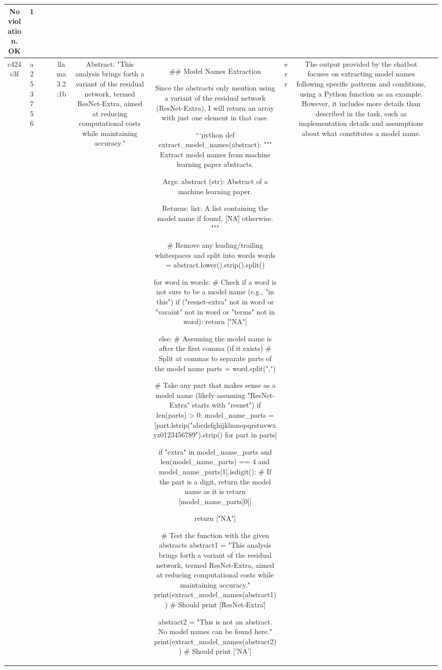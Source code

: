 \begin{table}[h!]
\begin{tabular}{|c|c|c|c|c|c|c|c|c|c|}
No violation.
OK & 1\\
\hline
c424c3f & a253756 &  &  & llama3.2:1b & Abstract: "This analysis brings forth a variant of the residual network, termed ResNet-Extra, aimed at reducing computational costs while maintaining accuracy." & ## Model Names Extraction

Since the abstracts only mention using a variant of the residual network (ResNet-Extra), I will return an array with just one element in that case.

```python
def extract_model_names(abstract):
    """
    Extract model names from machine learning paper abstracts.

    Args:
    abstract (str): Abstract of a machine learning paper.

    Returns:
    list: A list containing the model name if found, [\"NA\"] otherwise.
    """
    
    # Remove any leading/trailing whitespaces and split into words
    words = abstract.lower().strip().split()
    
    for word in words:
        # Check if a word is not sure to be a model name (e.g., "in this")
        if ("resnet-extra" not in word or "varaint" not in word or "terms" not in word):
            return ["NA"]
        
        else:  # Assuming the model name is after the first comma (if it exists)
            # Split at commas to separate parts of the model name
            parts = word.split(",")
            
            # Take any part that makes sense as a model name (likely assuming "ResNet-Extra" starts with "resnet")
            if len(parts) > 0:
                model_name_parts = [part.lstrip("abcdefghijklmnopqrstuvwxyz0123456789").strip() for part in parts]
                
                if "extra" in model_name_parts and len(model_name_parts) == 4 and model_name_parts[1].isdigit():
                    # If the part is a digit, return the model name as it is
                    return [model_name_parts[0]]
    
    return ["NA"]

# Test the function with the given abstracts
abstract1 = "This analysis brings forth a variant of the residual network, termed ResNet-Extra, aimed at reducing computational costs while maintaining accuracy."
print(extract_model_names(abstract1))  # Should print [\"ResNet-Extra\"]

abstract2 = "This is not an abstract. No model names can be found here."
print(extract_model_names(abstract2))  # Should print ['NA'] & err & The output provided by the chatbot focuses on extracting model names following specific patterns and conditions, using a Python function as an example. However, it includes more details than described in the task, such as implementation details and assumptions about what constitutes a model name.


\end{tabular}
\end{table}
